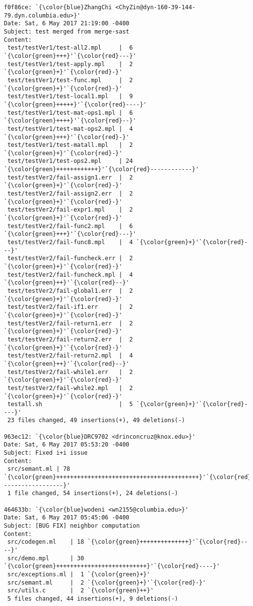 \begin{lstlisting}
f0f86ce: `{\color{blue}ZhangChi <ChyZin@dyn-160-39-144-79.dyn.columbia.edu>}'
Date: Sat, 6 May 2017 21:19:00 -0400
Subject: test merged from merge-sast
Content: 
 test/testVer1/test-all2.mpl     |  6 `{\color{green}+++}'`{\color{red}---}'
 test/testVer1/test-apply.mpl    |  2 `{\color{green}+}'`{\color{red}-}'
 test/testVer1/test-func.mpl     |  2 `{\color{green}+}'`{\color{red}-}'
 test/testVer1/test-local1.mpl   |  9 `{\color{green}+++++}'`{\color{red}----}'
 test/testVer1/test-mat-ops1.mpl |  6 `{\color{green}++++}'`{\color{red}--}'
 test/testVer1/test-mat-ops2.mpl |  4 `{\color{green}+++}'`{\color{red}-}'
 test/testVer1/test-matall.mpl   |  2 `{\color{green}+}'`{\color{red}-}'
 test/testVer1/test-ops2.mpl     | 24 `{\color{green}++++++++++++}'`{\color{red}------------}'
 test/testVer2/fail-assign1.err  |  2 `{\color{green}+}'`{\color{red}-}'
 test/testVer2/fail-assign2.err  |  2 `{\color{green}+}'`{\color{red}-}'
 test/testVer2/fail-expr1.mpl    |  2 `{\color{green}+}'`{\color{red}-}'
 test/testVer2/fail-func2.mpl    |  6 `{\color{green}+++}'`{\color{red}---}'
 test/testVer2/fail-func8.mpl    |  4 `{\color{green}+}'`{\color{red}---}'
 test/testVer2/fail-funcheck.err |  2 `{\color{green}+}'`{\color{red}-}'
 test/testVer2/fail-funcheck.mpl |  4 `{\color{green}++}'`{\color{red}--}'
 test/testVer2/fail-global1.err  |  2 `{\color{green}+}'`{\color{red}-}'
 test/testVer2/fail-if1.err      |  2 `{\color{green}+}'`{\color{red}-}'
 test/testVer2/fail-return1.err  |  2 `{\color{green}+}'`{\color{red}-}'
 test/testVer2/fail-return2.err  |  2 `{\color{green}+}'`{\color{red}-}'
 test/testVer2/fail-return2.mpl  |  4 `{\color{green}++}'`{\color{red}--}'
 test/testVer2/fail-while1.err   |  2 `{\color{green}+}'`{\color{red}-}'
 test/testVer2/fail-while2.mpl   |  2 `{\color{green}+}'`{\color{red}-}'
 testall.sh                      |  5 `{\color{green}+}'`{\color{red}----}'
 23 files changed, 49 insertions(+), 49 deletions(-)

963ec12: `{\color{blue}DRC9702 <drinconcruz@knox.edu>}'
Date: Sat, 6 May 2017 05:53:20 -0400
Subject: Fixed i+i issue
Content: 
 src/semant.ml | 78 `{\color{green}+++++++++++++++++++++++++++++++++++++++++}'`{\color{red}------------------}'
 1 file changed, 54 insertions(+), 24 deletions(-)

464633b: `{\color{blue}wodeni <wn2155@columbia.edu>}'
Date: Sat, 6 May 2017 05:45:06 -0400
Subject: [BUG FIX] neighbor computation
Content: 
 src/codegen.ml    | 18 `{\color{green}++++++++++++++}'`{\color{red}----}'
 src/demo.mpl      | 30 `{\color{green}++++++++++++++++++++++++++}'`{\color{red}----}'
 src/exceptions.ml |  1 `{\color{green}+}'
 src/semant.ml     |  2 `{\color{green}+}'`{\color{red}-}'
 src/utils.c       |  2 `{\color{green}++}'
 5 files changed, 44 insertions(+), 9 deletions(-)


\end{lstlisting}
